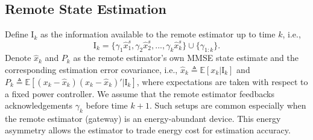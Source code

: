 \documentclass[twocolumn]{autart}    \usepackage{cite}
\begin{document}
{\subsection{Remote State Estimation} \label{sec:remote-state-estim}
Define $\mathrm{I}_k$ as the information available to the remote estimator up to time $k$, i.e.,
\begin{equation}\label{eqn:I_k}
  \mathrm{I}_k=\{\gamma_1\hat{x}_1^s, \gamma_2\hat{x}_2^s,...,\gamma_k\hat{x}_k^s\}\cup
  \{\gamma_{1:k}\}.
\end{equation}
 Denote $\hat{x}_k$ and $P_k$ as the remote estimator's own MMSE state estimate and the corresponding estimation error covariance, i.e.,
  $\hat{x}_k\triangleq\mathbb{E}[x_k|\mathrm{I}_k]$ and
  ${P}_k\triangleq\mathbb{E}[(x_k-\hat{x}_k)(x_k-\hat{x}_k)'|\mathrm{I}_k]$,
{where expectations are taken with respect to a fixed
power controller.}
We
assume that the remote estimator feedbacks acknowledgements $\gamma_k$ before time $k+1$. Such setups are common especially when the remote
estimator (gateway) is an energy-abundant device.
This energy asymmetry allows the estimator to trade energy cost for estimation
accuracy.



}
\end{document}
